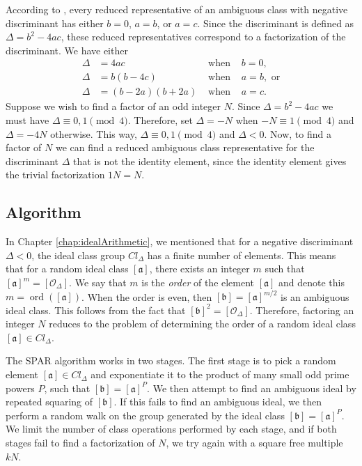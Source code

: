 \documentclass{ucalgthes1}
\theoremstyle{definition}
\DeclareMathOperator{\ord}{ord}
\newcommand{\aclass}{[\mathfrak a]}
\newcommand{\bclass}{[\mathfrak b]}
\newcommand{\idclass}{[\mathcal O_\Delta]}
\begin{document}
According to \cite{Schnorr1984}, every reduced representative of an ambiguous class with negative discriminant has either $b = 0$, $a = b$, or $a = c$.  Since the discriminant is defined as $\Delta = b^2 - 4ac$, these reduced representatives correspond to a factorization of the discriminant.  We have either
\begin{align*}
	\Delta &= 4ac & \textrm{ when } & b = 0, \\
	\Delta &= b(b - 4c) & \textrm{ when } & a = b, \textrm{ or} \\
	\Delta &= (b - 2a)(b + 2a) & \textrm{ when } & a = c.
\end{align*}
Suppose we wish to find a factor of an odd integer $N$. Since $\Delta = b^2 - 4ac$ we must have $\Delta \equiv 0, 1 \pmod 4$.  Therefore, set $\Delta = -N$ when $-N \equiv 1 \pmod 4$ and $\Delta = -4N$ otherwise.  This way, $\Delta \equiv 0, 1 \pmod 4$ and $\Delta < 0$. Now, to find a factor of $N$ we can find a reduced ambiguous class representative for the discriminant $\Delta$ that is not the identity element, since the identity element gives the trivial factorization $1N=N$.

\subsection{Algorithm}

In Chapter \ref{chap:idealArithmetic}, we mentioned that for a negative discriminant $\Delta < 0$, the ideal class group $Cl_\Delta$ has a finite number of elements.  This means that for a random ideal class $\aclass$, there exists an integer $m$ such that $\aclass^m = \idclass$. We say that $m$ is the \emph{order} of the element $\aclass$ and denote this $m = \ord(\aclass)$.  When the order is even, then $\bclass = \aclass^{m/2}$ is an ambiguous ideal class.  This follows from the fact that $\bclass^2 = \idclass$.  Therefore, factoring an integer $N$ reduces to the problem of determining the order of a random ideal class $\aclass \in Cl_\Delta$.

The SPAR algorithm works in two stages. The first stage is to pick a random element $\aclass \in Cl_\Delta$ and exponentiate it to the product of many small odd prime powers $P$, such that $\bclass = \aclass^P$.  We then attempt to find an ambiguous ideal by repeated squaring of $\bclass$.  If this fails to find an ambiguous ideal, we then perform a random walk on the group generated by the ideal class $\bclass = \aclass^P$.  We limit the number of class operations performed by each stage, and if both stages fail to find a factorization of $N$, we try again with a square free multiple $kN$.
\end{document}
